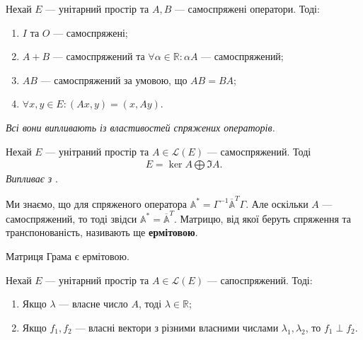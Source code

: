 \documentclass{math_library}
\begin{document}
\begin{proposition}
Нехай $E$ --- унітарний простір та $A,B$ --- самоспряжені оператори. Тоді:
\begin{enumerate}[nosep,wide=0pt,label={\arabic*)},start=0]
\item $I$ та $O$ --- самоспряжені;
\item $A+B$ --- самоспряжений та $\forall \alpha \in \mathbb{R}: \alpha A$ --- самоспряжений;
\item $AB$ --- самоспряжений за умовою, що $AB = BA$;
\item $\forall x,y \in E: (Ax,y) = (x,Ay)$.
\end{enumerate}
\textit{Всі вони випливають із властивостей спряжених операторів.}
\end{proposition}

\begin{theorem}
\label{euclid_decomposition_2}
Нехай $E$ --- унітраний простір та $A \in \mathcal{L}(E)$ --- самоспряжений. Тоді
\begin{align*}
E = \ker A \bigoplus \Im A.
\end{align*}
\textit{Випливає з } .
\end{theorem}

\begin{remark}
Ми знаємо, що для спряженого оператора $\mathbb{A}^* = \Gamma^{-1} \overline{\mathbb{A}}^T \Gamma$. Але оскільки $A$ --- самоспряжений, то тоді звідси $\mathbb{A}^* = \overline{\mathbb{A}}^T$. Матрицю, від якої беруть спряження та транспонованість, називають ще \textbf{ермітовою}.
\end{remark}

\begin{remark}
Матриця Грама є ермітовою.
\end{remark}

\begin{proposition}
Нехай $E$ --- унітарний простір та $A \in \mathcal{L}(E)$ --- сапоспряжений. Тоді:
\begin{enumerate}[nosep,wide=0pt,label={\arabic*)}]
\item Якщо $\lambda$ --- власне число $A$, тоді $\lambda \in \mathbb{R}$;
\item Якщо $f_1,f_2$ --- власні вектори з різними власними числами $\lambda_1, \lambda_2$, то $f_1 \perp f_2$.
\end{enumerate}
\end{proposition}
\end{document}
